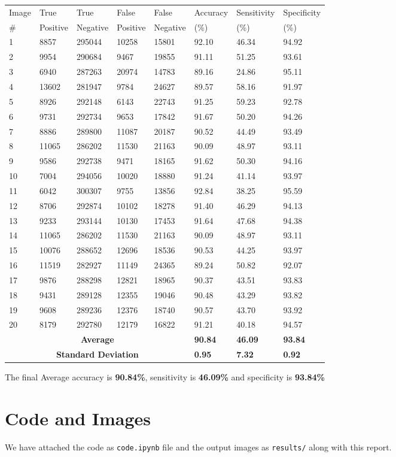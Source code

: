 \documentclass{article}
\begin{document}
\begin{center}
    \begin{tabular}{|l|l|l|l|l|l|l|l|}
    \hline
        Image & True & True & False & False & Accuracy & Sensitivity & Specificity \\
        \# & Positive & Negative & Positive & Negative & (\%) &  (\%) & (\%) \\ \hline
        1 & 8857 & 295044 & 10258 & 15801 & 92.10 & 46.34 & 94.92 \\ \hline
        2 & 9954 & 290684 & 9467 & 19855 & 91.11 & 51.25 & 93.61 \\ \hline
        3 & 6940 & 287263 & 20974 & 14783 & 89.16 & 24.86 & 95.11 \\ \hline
        4 & 13602 & 281947 & 9784 & 24627 & 89.57 & 58.16 & 91.97 \\ \hline
        5 & 8926 & 292148 & 6143 & 22743 & 91.25 & 59.23 & 92.78 \\ \hline
        6 & 9731 & 292734 & 9653 & 17842 & 91.67 & 50.20 & 94.26 \\ \hline
        7 & 8886 & 289800 & 11087 & 20187 & 90.52 & 44.49 & 93.49 \\ \hline
        8 & 11065 & 286202 & 11530 & 21163 & 90.09 & 48.97 & 93.11 \\ \hline
        9 & 9586 & 292738 & 9471 & 18165 & 91.62 & 50.30 & 94.16 \\ \hline
        10 & 7004 & 294056 & 10020 & 18880 & 91.24 & 41.14 & 93.97 \\ \hline
        11 & 6042 & 300307 & 9755 & 13856 & 92.84 & 38.25 & 95.59 \\ \hline
        12 & 8706 & 292874 & 10102 & 18278 & 91.40 & 46.29 & 94.13 \\ \hline
        13 & 9233 & 293144 & 10130 & 17453 & 91.64 & 47.68 & 94.38 \\ \hline
        14 & 11065 & 286202 & 11530 & 21163 & 90.09 & 48.97 & 93.11 \\ \hline
        15 & 10076 & 288652 & 12696 & 18536 & 90.53 & 44.25 & 93.97 \\ \hline
        16 & 11519 & 282927 & 11149 & 24365 & 89.24 & 50.82 & 92.07 \\ \hline
        17 & 9876 & 288298 & 12821 & 18965 & 90.37 & 43.51 & 93.83 \\ \hline
        18 & 9431 & 289128 & 12355 & 19046 & 90.48 & 43.29 & 93.82 \\ \hline
        19 & 9608 & 289236 & 12376 & 18740 & 90.57 & 43.70 & 93.92 \\ \hline
        20 & 8179 & 292780 & 12179 & 16822 & 91.21 & 40.18 & 94.57 \\ \hline
        \multicolumn{5}{|c|}{\textbf{Average}}  & \textbf{90.84} & \textbf{46.09} & \textbf{93.84} \\ \hline
        \multicolumn{5}{|c|}{\textbf{Standard Deviation}} & \textbf{0.95} & \textbf{7.32} & \textbf{0.92} \\ \hline
    \end{tabular}
\end{center}


The final Average accuracy is \textbf{90.84\%}, sensitivity is \textbf{46.09\%} and specificity is \textbf{93.84\%}

\section{Code and Images}
We have attached the code as \texttt{code.ipynb} file and the output images as \texttt{results/} along with this report.
\end{document}
